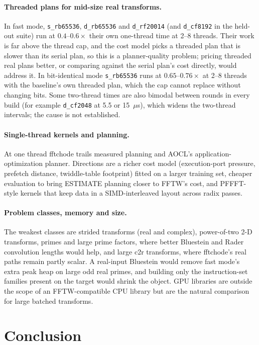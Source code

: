 \documentclass[10pt]{article}
\theoremstyle{definition}
\begin{document}
\paragraph{Threaded plans for mid-size real transforms.} In fast mode, \texttt{s\_rb65536}, \texttt{d\_rb65536} and \texttt{d\_rf20014} (and \texttt{d\_cf8192} in the held-out suite) run at $0.4$--$0.6\times$ their own one-thread time at 2--8 threads. Their work is far above the thread cap, and the cost model picks a threaded plan that is slower than its serial plan, so this is a planner-quality problem; pricing threaded real plans better, or comparing against the serial plan's cost directly, would address it. In bit-identical mode \texttt{s\_rb65536} runs at $0.65$--$0.76\times$ at 2--8 threads with the baseline's own threaded plan, which the cap cannot replace without changing bits. Some two-thread times are also bimodal between rounds in every build (for example \texttt{d\_cf2048} at 5.5 or 15~$\mu$s), which widens the two-thread intervals; the cause is not established.

\paragraph{Single-thread kernels and planning.} At one thread fftchode trails measured planning and AOCL's application-optimization planner. Directions are a richer cost model (execution-port pressure, prefetch distance, twiddle-table footprint) fitted on a larger training set, cheaper evaluation to bring ESTIMATE planning closer to FFTW's cost, and PFFFT-style kernels that keep data in a SIMD-interleaved layout across radix passes.

\paragraph{Problem classes, memory and size.} The weakest classes are strided transforms (real and complex), power-of-two 2-D transforms, primes and large prime factors, where better Bluestein and Rader convolution lengths would help, and large c2r transforms, where fftchode's real paths remain partly scalar. A real-input Bluestein would remove fast mode's extra peak heap on large odd real primes, and building only the instruction-set families present on the target would shrink the object. GPU libraries are outside the scope of an FFTW-compatible CPU library but are the natural comparison for large batched transforms.

\section{Conclusion}\label{sec:conclusion}
\end{document}
